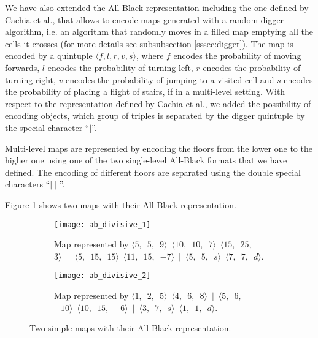 \par

We have also extended the All-Black representation including the one defined by Cachia et al.\cite{MultiLevelEvolution}, that allows to encode maps generated with a random digger algorithm, i.e. an algorithm that randomly moves in a filled map emptying all the cells it crosses (for more details see subsubsection \ref{sssec:digger}). The map is encoded by a quintuple $\langle f,l,r,v,s \rangle$, where $f$ encodes the probability of moving forwards, $l$ encodes the probability of turning left, $r$ encodes the probability of turning right, $v$ encodes the probability of jumping to a visited cell and $s$ encodes the probability of placing a flight of stairs, if in a multi-level setting. With respect to the representation defined by Cachia et al., we added the possibility of encoding objects, which group of triples is separated by the digger quintuple by the special character ``$\mid$''.

\par

Multi-level maps are represented by encoding the floors from the lower one to the higher one using one of the two single-level All-Black formats that we have defined. The encoding of different floors are separated using the double special characters ``$\mid\mid$''.

\par

Figure \ref{fig:allblack} shows two maps with their All-Black representation.

\begin{figure}[tp]
	\centering
  	\begin{subfigure}[t]{0.45\linewidth}
		\texttt{[image: ab\_divisive\_1]}
     		\caption{Map represented by $\langle 5, $\ $ 5, $\ $ 9 \rangle $\ $ \langle 10, $\ $ 10, $\ $ 7 \rangle $\ $  \langle 15, $\ $ 25, $\ $ 3 \rangle\ $\ $ \mid $\ $  \langle 5, $\ $ 15, $\ $ 15 \rangle $\ $  \langle 11, $\ $ 15, $\ $ -7 \rangle $\ $  \mid $\ $  \langle 5, $\ $ 5, $\ $ s \rangle $\ $  \langle 7, $\ $ 7, $\ $ d \rangle$.}
 	\end{subfigure}
  	\begin{subfigure}[t]{0.45\linewidth}
    		\texttt{[image: ab\_divisive\_2]}
     		\caption{Map represented by $\langle 1,$\ $2, $\ $5  \rangle $\ $\langle4,$\ $6,$\ $8\rangle $\ $ \mid $\ $ \langle5,$\ $6,$\ $-10\rangle $\ $ \langle10,$\ $15,$\ $-6\rangle $\ $ \mid $\ $ \langle3, $\ $7, $\ $s\rangle $\ $ \langle1, $\ $1, $\ $d\rangle$.}
  	\end{subfigure}
\caption{Two simple maps with their All-Black representation.}
\label{fig:allblack}
\end{figure}

